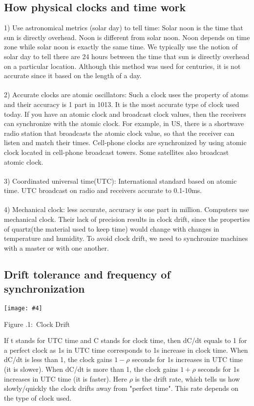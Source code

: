 \documentclass[twoside]{article}
\newcounter{lecnum}
\newcommand{\fig}[4]{
            \centerline{\texttt{[image: \#4]}}
            \begin{center}
            Figure \thelecnum.#1:~#3
            \end{center}
    }
\begin{document}
\subsection{How physical clocks and time work}
1) Use astronomical metrics (solar day) to tell time: Solar noon is the time that sun is directly overhead. Noon is different from solar noon. Noon depends on time zone while solar noon is exactly the same time. We typically use the notion of solar day to tell there are 24 hours between the time that sun is directly overhead on a particular location. Although this method was used for centuries, it is not accurate since it based on the length of a day.\\\\
2) Accurate clocks are atomic oscillators: Such a clock uses the property of atoms and their accuracy is 1 part in 1013. It is the most accurate type of clock used today. If you have an atomic clock and broadcast clock values, then the receivers can synchronize with the atomic clock. For example, in US, there is a shortwave radio station that broadcasts the atomic clock value, so that the receiver can listen and match their times. Cell-phone clocks are synchronized by using atomic clock located in cell-phone broadcast towers. Some satellites also broadcast atomic clock.\\\\
3) Coordinated universal time(UTC): International standard based on atomic time. UTC broadcast on radio and receivers accurate to 0.1-10ms.\\\\
4) Mechanical clock: less accurate, accuracy is one part in million. Computers use mechanical clock. Their lack of precision results in clock drift, since the properties of quartz(the material used to keep time) would change with changes in temperature and humidity. To avoid clock drift, we need to synchronize machines with a master or with one another.

\subsection{Drift tolerance and frequency of synchronization}
\fig{1}{0.7}{Clock Drift}{../Pictures/drift.png}
If t stands for UTC time and C stands for clock time, then dC/dt equals to 1 for a perfect clock as 1s in UTC time corresponds to 1s increase in clock time. When dC/dt is less than 1, the clock gains $1 - \rho$ seconds for 1s increases in UTC time (it is slower). When dC/dt is more than 1, the clock gains $1 + \rho$ seconds for 1s increases in UTC time (it is faster). Here $\rho$ is the drift rate, which tells us how slowly/quickly the clock drifts away from "perfect time". This rate depends on the type of clock used.\\
\end{document}

